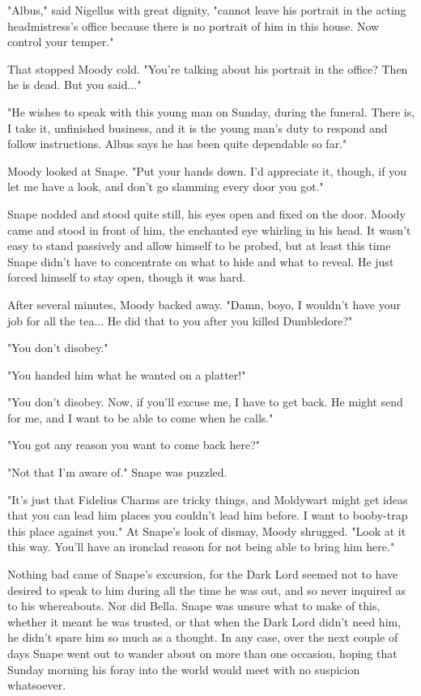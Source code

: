 \documentclass[a4paper,11pt]{article}
\begin{document}
"Albus," said Nigellus with great dignity, "cannot leave his portrait in the acting headmistress's office because there is no portrait of him in this house. Now control your temper."

That stopped Moody cold. "You're talking about his portrait in the office? Then he is dead. But you said..."

"He wishes to speak with this young man on Sunday, during the funeral. There is, I take it, unfinished business, and it is the young man's duty to respond and follow instructions. Albus says he has been quite dependable so far."

Moody looked at Snape. "Put your hands down. I'd appreciate it, though, if you let me have a look, and don't go slamming every door you got."

Snape nodded and stood quite still, his eyes open and fixed on the door. Moody came and stood in front of him, the enchanted eye whirling in his head. It wasn't easy to stand passively and allow himself to be probed, but at least this time Snape didn't have to concentrate on what to hide and what to reveal. He just forced himself to stay open, though it was hard.

After several minutes, Moody backed away. "Damn, boyo, I wouldn't have your job for all the tea... He did that to you after you killed Dumbledore?"

"You don't disobey."

"You handed him what he wanted on a platter!"

"You don't disobey. Now, if you'll excuse me, I have to get back. He might send for me, and I want to be able to come when he calls."

"You got any reason you want to come back here?"

"Not that I'm aware of." Snape was puzzled.

"It's just that Fidelius Charms are tricky things, and Moldywart might get ideas that you can lead him places you couldn't lead him before. I want to booby-trap this place against you." At Snape's look of dismay, Moody shrugged. "Look at it this way. You'll have an ironclad reason for not being able to bring him here."

Nothing bad came of Snape's excursion, for the Dark Lord seemed not to have desired to speak to him during all the time he was out, and so never inquired as to his whereabouts. Nor did Bella. Snape was unsure what to make of this, whether it meant he was trusted, or that when the Dark Lord didn't need him, he didn't spare him so much as a thought. In any case, over the next couple of days Snape went out to wander about on more than one occasion, hoping that Sunday morning his foray into the world would meet with no suspicion whatsoever.
\end{document}
